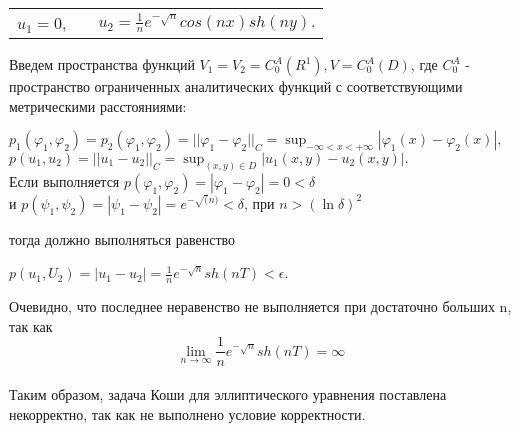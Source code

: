 \documentclass[../main.tex]{subfiles}
\begin{document}
\begin{center}
	\begin{tabular}{c c c}
		$u_1=0$, &  & $u_2=\frac{1}{n}e^{-\sqrt{n}}cos(nx)sh(ny).$
	\end{tabular}
\end{center}

Введем пространства функций $V_1=V_2=C_0^A(R^1), V=C_0^A(D)$, где $C_0^A$ - пространство ограниченных аналитических функций с соответствующими метрическими расстояниями:
\begin{center}
	$p_1(\varphi_1,\varphi_2)=p_2(\varphi_1, \varphi_2) =||\varphi_1-\varphi_2||_C = \sup_{-\infty<x<+\infty}|\varphi_1(x)-\varphi_2(x)|, $\\
	$ $\\
	$p(u_1, u_2)=||u_1-u_2||_C=\sup_{(x,y) \in D}|u_1(x,y)-u_2(x,y)|.$\\
	$ $\\
	Если выполняется $p(\varphi_1,\varphi_2)=|\varphi_1-\varphi_2|=0<\delta$\\
	$ $\\
	и $p(\psi_1,\psi_2)=|\psi_1-\psi_2|=e^{-\sqrt(n)}<\delta$, при $n>(\ln{\delta})^2$
\end{center}

тогда должно выполняться равенство

\begin{center}
	$p(u_1,U_2)=|u_1-u_2|=\frac{1}{n}e^{-\sqrt{n}}sh(nT)<\epsilon$.
\end{center}

Очевидно, что последнее неравенство не выполняется при достаточно больших n, так как \[\lim_{n \to \infty}{\frac{1}{n}}e^{-\sqrt{n}}sh(nT)=\infty\]\\

Таким образом, задача Коши для эллиптического уравнения поставлена некорректно, так как не выполнено условие корректности.
\end{document}
